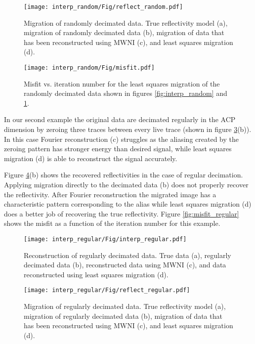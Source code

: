 \begin{figure}[h] %
	\centering
	\texttt{[image: interp\_random/Fig/reflect\_random.pdf]}
	\caption{Migration of randomly decimated data. True reflectivity model (a), migration of randomly decimated data (b), migration of data that has been reconstructed using MWNI (c), and least squares migration (d).}
	\label{fig:reflect_random}
\end{figure}

\begin{figure}[h] %
	\centering
	\texttt{[image: interp\_random/Fig/misfit.pdf]}
	\caption{Misfit vs. iteration number for the least squares migration of the randomly decimated data shown in figures \ref{fig:interp_random} and \ref{fig:reflect_random}.}
	\label{fig:misfit_random}
\end{figure}

In our second example the original data are decimated regularly in the ACP dimension by zeroing three traces between every live trace (shown in figure \ref{fig:interp_regular}(b)). In this case Fourier reconstruction (c) struggles as the aliasing created by the zeroing pattern has stronger energy than desired signal, while least squares migration (d) is able to reconstruct the signal accurately. 

Figure \ref{fig:reflect_regular}(b) shows the recovered reflectivities in the case of regular decimation. Applying migration directly to the decimated data (b) does not properly recover the reflectivity. After Fourier reconstruction the migrated image has a characteristic pattern corresponding to the alias while least squares migration (d) does a better job of recovering the true reflectivity. Figure \ref{fig:misfit_regular} shows the misfit as a function of the iteration number for this example.  
 
\begin{figure}[h] %
	\centering
	\texttt{[image: interp\_regular/Fig/interp\_regular.pdf]}
	\caption{Reconstruction of regularly decimated data. True data (a), regularly decimated data (b), reconstructed data using MWNI (c), and data reconstructed using least squares migration (d).}
	\label{fig:interp_regular}
\end{figure}

\begin{figure}[h] %
	\centering
	\texttt{[image: interp\_regular/Fig/reflect\_regular.pdf]}
	\caption{Migration of regularly decimated data. True reflectivity model (a), migration of regularly decimated data (b), migration of data that has been reconstructed using MWNI (c), and least squares migration (d).}
	\label{fig:reflect_regular}
\end{figure}

